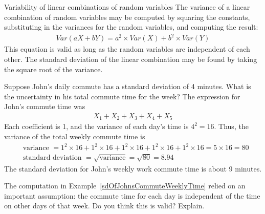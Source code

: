 \begin{onebox}{Variability of linear combinations of random variables}
The variance of a linear combination of random variables may be computed by squaring the constants, substituting in the variances for the random variables, and computing the result:
\begin{align*}
Var(aX + bY) = a^2\times Var(X) + b^2\times Var(Y)
\end{align*}
This equation is valid as long as the random variables are independent of each other. The standard deviation of the linear combination may be found by taking the square root of the variance.
\end{onebox}

\begin{examplewrap}
\begin{nexample}{Suppose John's daily commute has a standard deviation of 4 minutes. What is the uncertainty in his total commute time for the week?} \label{sdOfJohnsCommuteWeeklyTime}
The expression for John's commute time was
\begin{align*}
X_1 + X_2 + X_3 + X_4 + X_5
\end{align*}
Each coefficient is 1, and the variance of each day's time is $4^2=16$. Thus, the variance of the total weekly commute time is
\begin{align*}
&\text{variance }= 1^2 \times  16 + 1^2 \times  16 + 1^2 \times  16 + 1^2 \times  16 + 1^2 \times  16 = 5\times 16 = 80 \\
&\text{standard deviation } = \sqrt{\text{variance}} = \sqrt{80} = 8.94
\end{align*}
The standard deviation for John's weekly work commute time is about 9 minutes.
\end{nexample}
\end{examplewrap}

\begin{exercisewrap}
\begin{nexercise}
The computation in Example~\ref{sdOfJohnsCommuteWeeklyTime} relied on an important assumption: the commute time for each day is independent of the time on other days of that week. Do you think this is valid? Explain.\footnotemark
\end{nexercise}
\end{exercisewrap}

